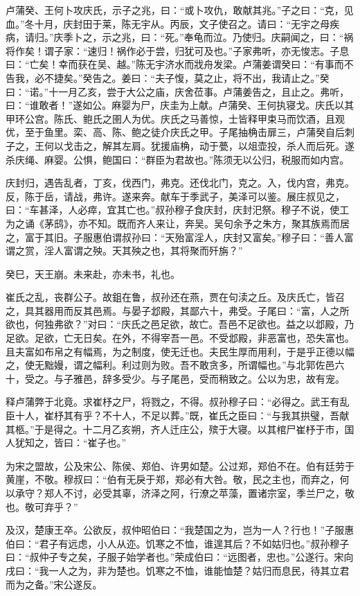 \documentclass[]{article}
\begin{document}
卢蒲癸、王何卜攻庆氏，示子之兆，曰：``或卜攻仇，敢献其兆。''子之曰：``克，见血。''冬十月，庆封田于莱，陈无宇从。丙辰，文子使召之。请曰：``无宇之母疾病，请归。''庆季卜之，示之兆，曰：``死。''奉龟而泣。乃使归。庆嗣闻之，曰：``祸将作矣！谓子家：``速归！祸作必于尝，归犹可及也。''子家弗听，亦无悛志。子息曰：``亡矣！幸而获在吴、越。''陈无宇济水而戕舟发梁。卢蒲姜谓癸曰：``有事而不告我，必不捷矣。''癸告之。姜曰：``夫子愎，莫之止，将不出，我请止之。''癸曰：``诺。''十一月乙亥，尝于大公之庙，庆舍莅事。卢蒲姜告之，且止之。弗听，曰：``谁敢者！''遂如公。麻婴为尸，庆圭为上献。卢蒲癸、王何执寝戈。庆氏以其甲环公宫。陈氏、鲍氏之圉人为优。庆氏之马善惊，士皆释甲束马而饮酒，且观优，至于鱼里。栾、高、陈、鲍之徒介庆氏之甲。子尾抽桷击扉三，卢蒲癸自后刺子之，王何以戈击之，解其左肩。犹援庙桷，动于甍，以俎壶投，杀人而后死。遂杀庆绳、麻婴。公惧，鲍国曰：``群臣为君故也。''陈须无以公归，税服而如内宫。

庆封归，遇告乱者，丁亥，伐西门，弗克。还伐北门，克之。入，伐内宫，弗克。反，陈于岳，请战，弗许。遂来奔。献车于季武子，美泽可以鉴。展庄叔见之，曰：``车甚泽，人必瘁，宜其亡也。''叔孙穆子食庆封，庆封汜祭。穆子不说，使工为之诵《茅鸱》，亦不知。既而齐人来让，奔吴。吴句余予之朱方，聚其族焉而居之，富于其旧。子服惠伯谓叔孙曰：``天殆富淫人，庆封又富矣。''穆子曰：``善人富谓之赏，淫人富谓之殃。天其殃之也，其将聚而歼旃？''

癸巳，天王崩。未来赴，亦未书，礼也。

崔氏之乱，丧群公子。故鉏在鲁，叔孙还在燕，贾在句渎之丘。及庆氏亡，皆召之，具其器用而反其邑焉。与晏子邶殿，其鄙六十，弗受。子尾曰：``富，人之所欲也，何独弗欲？''对曰：``庆氏之邑足欲，故亡。吾邑不足欲也。益之以邶殿，乃足欲。足欲，亡无日矣。在外，不得宰吾一邑。不受邶殿，非恶富也，恐失富也。且夫富如布帛之有幅焉，为之制度，使无迁也。夫民生厚而用利，于是乎正德以幅之，使无黜嫚，谓之幅利。利过则为败。吾不敢贪多，所谓幅也。''与北郭佐邑六十，受之。与子雅邑，辞多受少。与子尾邑，受而稍致之。公以为忠，故有宠。

释卢蒲弊于北竟。求崔杼之尸，将戮之，不得。叔孙穆子曰：``必得之。武王有乱臣十人，崔杼其有乎？不十人，不足以葬。''既，崔氏之臣曰：``与我其拱璧，吾献其柩。''于是得之。十二月乙亥朔，齐人迁庄公，殡于大寝。以其棺尸崔杼于市，国人犹知之，皆曰：``崔子也。''

为宋之盟故，公及宋公、陈侯、郑伯、许男如楚。公过郑，郑伯不在。伯有廷劳于黄崖，不敬。穆叔曰：``伯有无戾于郑，郑必有大咎。敬，民之主也，而弃之，何以承守？郑人不讨，必受其辜，济泽之阿，行潦之苹藻，置诸宗室，季兰尸之，敬也。敬可弃乎？''

及汉，楚康王卒。公欲反，叔仲昭伯曰：``我楚国之为，岂为一人？行也！''子服惠伯曰：``君子有远虑，小人从迩。饥寒之不恤，谁遑其后？不如姑归也。''叔孙穆子曰：``叔仲子专之矣，子服子始学者也。''荣成伯曰：``远图者，忠也。''公遂行。宋向戌曰：``我一人之为，非为楚也。饥寒之不恤，谁能恤楚？姑归而息民，待其立君而为之备。''宋公遂反。
\end{document}
